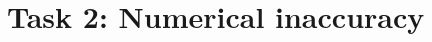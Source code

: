 \documentclass[english,a4paper,12pt,oneside]{article}
\begin{document}
% 





% 
% 
% 


\section{Task 2: Numerical inaccuracy}
\end{document}
